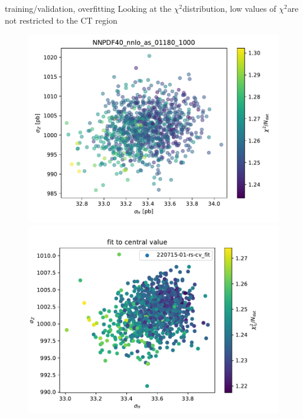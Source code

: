 \documentclass[aspectratio=169,10pt]{beamer}
\newcommand{\chitwo}{$\chi^2$}
\begin{document}
\begin{frame}[t]{training/validation, overfitting}
  Looking at the \chitwo distribution, low values of \chitwo are not restricted to the CT region
  \begin{figure}
    \centering
    \includegraphics[height=.55\textheight]{nnpdf40_chi2_scatter.pdf}
    \includegraphics[height=.55\textheight]{chi2_fit_to_central_value.pdf}
  \end{figure}
\end{frame}
\end{document}
